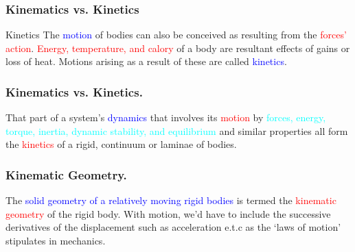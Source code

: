 \begin{frame}
	\frametitle{Kinematics vs. Kinetics}
	\begin{block}{Kinetics}
		The \textcolor{blue}{motion} of bodies can also be conceived as resulting from the  \textcolor{red}{forces' action}.  \textcolor{red}{Energy, temperature, and calory} of a body are resultant effects of gains or loss of heat. Motions arising as a result of these are called \textcolor{blue}{kinetics}.
	\end{block}
\end{frame}


\begin{frame}
	\frametitle{Kinematics vs. Kinetics.}
	\begin{definition}
		That part of a system's \textcolor{blue}{dynamics} that involves its \textcolor{red}{motion} by \textcolor{cyan}{forces, energy, torque, inertia, dynamic stability, and equilibrium} and similar properties all form the \textcolor{red}{kinetics} of a \textcolor{light-blue}{{rigid}}, \textcolor{light-blue}{{continuum}} or \textcolor{light-blue}{{laminae}} of bodies.
	\end{definition}
\end{frame}

\begin{frame}
	\frametitle{Kinematic Geometry.}
	\begin{definition}
		The \textcolor{blue}{solid geometry of a relatively moving rigid bodies} is termed the \textcolor{red}{kinematic geometry} of the rigid body. With motion, we'd have to include the successive derivatives of the displacement such as acceleration e.t.c as the `laws of motion' stipulates in mechanics.
	\end{definition}
\end{frame}